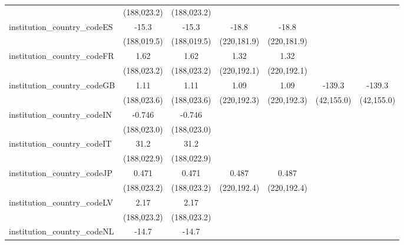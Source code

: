\begin{tabular}{lcccccc}
                                         & (188,023.2)   & (188,023.2)   &               &               &              &   \\   
   institution\_country\_codeES          & -15.3         & -15.3         & -18.8         & -18.8         &              &   \\   
                                         & (188,019.5)   & (188,019.5)   & (220,181.9)   & (220,181.9)   &              &   \\   
   institution\_country\_codeFR          & 1.62          & 1.62          & 1.32          & 1.32          &              &   \\   
                                         & (188,023.2)   & (188,023.2)   & (220,192.1)   & (220,192.1)   &              &   \\   
   institution\_country\_codeGB          & 1.11          & 1.11          & 1.09          & 1.09          & -139.3       & -139.3\\   
                                         & (188,023.6)   & (188,023.6)   & (220,192.3)   & (220,192.3)   & (42,155.0)   & (42,155.0)\\   
   institution\_country\_codeIN          & -0.746        & -0.746        &               &               &              &   \\   
                                         & (188,023.0)   & (188,023.0)   &               &               &              &   \\   
   institution\_country\_codeIT          & 31.2          & 31.2          &               &               &              &   \\   
                                         & (188,022.9)   & (188,022.9)   &               &               &              &   \\   
   institution\_country\_codeJP          & 0.471         & 0.471         & 0.487         & 0.487         &              &   \\   
                                         & (188,023.2)   & (188,023.2)   & (220,192.4)   & (220,192.4)   &              &   \\   
   institution\_country\_codeLV          & 2.17          & 2.17          &               &               &              &   \\   
                                         & (188,023.2)   & (188,023.2)   &               &               &              &   \\   
   institution\_country\_codeNL          & -14.7         & -14.7         &               &               &              &   \\   

\end{tabular}
